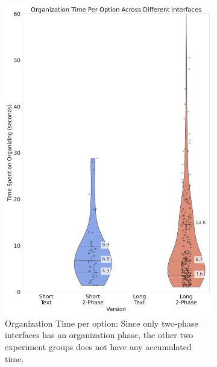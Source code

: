 \begin{figure}[htbp]
{\begin{minipage}{0.7\pdfpageheight}
            \begin{subfigure}[b]{0.24\pdfpageheight}
                \centering
                \includegraphics[width=\textwidth]{content/image/results/org_time_per_option.pdf}
                \captionsetup{width=0.87\textwidth}
                \caption{Organization Time per option: Since only two-phase interfaces has an organization phase, the other two experiment groups does not have any accumulated time.\vspace{25pt}}
                \label{fig:org_time}
            \end{subfigure}
            \begin{subfigure}[b]{0.24\pdfpageheight}
                \centering

\end{subfigure}
\end{minipage}}
\end{figure}
